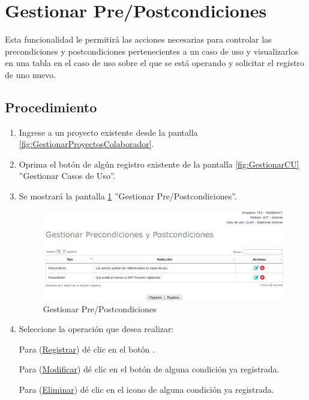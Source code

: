 \hypertarget{cv:GestionarPrecondiciones}{\section{Gestionar Pre/Postcondiciones}} \label{sec:GestionarPrecondiciones}

	Esta funcionalidad le permitirá las acciones necesarias para controlar las precondiciones y postcondiciones pertenecientes a un caso de uso y visualizarlos en una tabla en el caso de uso sobre el que se está operando y solicitar el registro de uno nuevo.

		\subsection{Procedimiento}

			\begin{enumerate}
				
			\item Ingrese a un proyecto existente desde la pantalla \ref{fig:GestionarProyectosColaborador}.
			
			\item Oprima el botón \IUCondiciones{} de algún registro existente de la pantalla \ref{fig:GestionarCU} ''Gestionar Casos de Uso''.
	
			\item Se mostrará la pantalla \ref{fig:GestionarPrePostcondiciones} ''Gestionar Pre/Postcondiciones''.

			\begin{figure}[htbp!]
				\begin{center}
					\includegraphics[scale=0.6]{roles/lider/casosUso/precondiciones/pantallas/IU6-1-2gestionarCondiciones}
					\caption{Gestionar Pre/Postcondiciones}
					\label{fig:GestionarPrePostcondiciones}
				\end{center}
			\end{figure}
		
				\item Seleccione la operación que desea realizar:
			
			Para (\hyperlink{cv:registrarCondicion}{Registrar}) dé clic en el botón \IURegistrar.
			
			Para (\hyperlink{cv:modificarCondicion}{Modificar}) dé clic en el botón \IUEditar de alguna condición ya registrada.
			
			Para (\hyperlink{cv:eliminarCondicion}{Eliminar}) dé clic en el icono \IUBotonEliminar{} de alguna condición ya registrada.
			
			\end{enumerate}